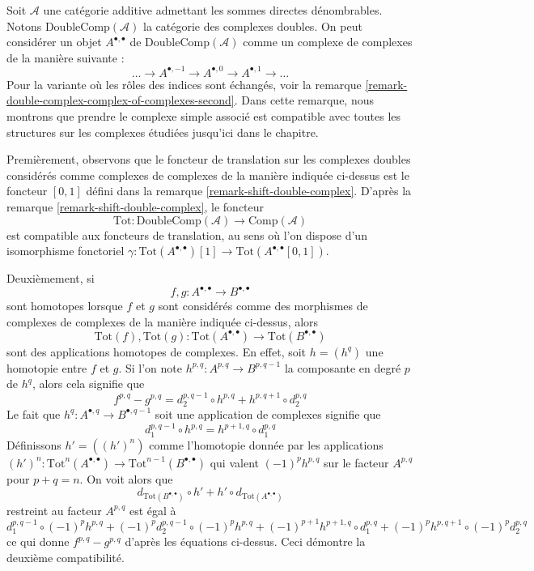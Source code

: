 \begin{remark}
\label{remark-double-complex-complex-of-complexes-first}
Soit $\mathcal{A}$ une catégorie additive admettant les sommes directes dénombrables.
Notons $\text{DoubleComp}(\mathcal{A})$ la catégorie des complexes doubles.
On peut considérer un objet $A^{\bullet, \bullet}$ de
$\text{DoubleComp}(\mathcal{A})$ comme un complexe de complexes
de la manière suivante :
$$
\ldots \to A^{\bullet, -1} \to A^{\bullet, 0} \to A^{\bullet, 1} \to \ldots
$$
Pour la variante où les rôles des indices sont échangés, voir la
remarque \ref{remark-double-complex-complex-of-complexes-second}.
Dans cette remarque, nous montrons que prendre le complexe simple associé
est compatible avec toutes les structures sur les complexes étudiées
jusqu'ici dans le chapitre.

\medskip\noindent
Premièrement, observons que le foncteur de translation sur les complexes doubles considérés
comme complexes de complexes de la manière indiquée ci-dessus est le foncteur
$[0, 1]$ défini dans la remarque \ref{remark-shift-double-complex}.
D'après la remarque \ref{remark-shift-double-complex}, le foncteur
$$
\text{Tot} : \text{DoubleComp}(\mathcal{A}) \to \text{Comp}(\mathcal{A})
$$
est compatible aux foncteurs de translation, au sens où l'on dispose d'un isomorphisme
fonctoriel $\gamma : \text{Tot}(A^{\bullet, \bullet})[1] \to
\text{Tot}(A^{\bullet, \bullet}[0, 1])$.

\medskip\noindent
Deuxièmement, si
$$
f, g : A^{\bullet, \bullet} \to B^{\bullet, \bullet}
$$
sont homotopes lorsque $f$ et $g$ sont considérés comme des morphismes de complexes
de complexes de la manière indiquée ci-dessus, alors
$$
\text{Tot}(f), \text{Tot}(g) :
\text{Tot}(A^{\bullet, \bullet}) \to \text{Tot}(B^{\bullet, \bullet})
$$
sont des applications homotopes de complexes. En effet, soit $h = (h^q)$
une homotopie entre $f$ et $g$. Si l'on note
$h^{p, q} : A^{p, q} \to B^{p, q - 1}$ la composante en degré $p$ de $h^q$,
alors cela signifie que
$$
f^{p, q} - g^{p, q} = d_2^{p, q - 1} \circ h^{p, q} +
h^{p, q + 1} \circ d_2^{p, q}
$$
Le fait que $h^q : A^{\bullet, q} \to B^{\bullet, q - 1}$ soit une application de
complexes signifie que
$$
d_1^{p, q - 1} \circ h^{p, q} = h^{p + 1, q} \circ d_1^{p, q}
$$
Définissons $h' = ((h')^n)$ comme l'homotopie donnée par les applications
$(h')^n : \text{Tot}^n(A^{\bullet, \bullet}) \to
\text{Tot}^{n - 1}(B^{\bullet, \bullet})$
qui valent $(-1)^ph^{p, q}$ sur le facteur $A^{p, q}$ pour $p + q = n$.
On voit alors que
$$
d_{\text{Tot}(B^{\bullet, \bullet})} \circ h' +
h' \circ d_{\text{Tot}(A^{\bullet, \bullet})}
$$
restreint au facteur $A^{p, q}$ est égal à
$$
d_1^{p, q - 1} \circ (-1)^p h^{p, q} +
(-1)^p d_2^{p, q - 1} \circ (-1)^p h^{p, q} +
(-1)^{p + 1} h^{p + 1, q} \circ d_1^{p, q} +
(-1)^p h^{p, q + 1} \circ (-1)^p d_2^{p, q}
$$
ce qui donne $f^{p, q} - g^{p, q}$ d'après les équations ci-dessus.
Ceci démontre la deuxième compatibilité.


\end{remark}
